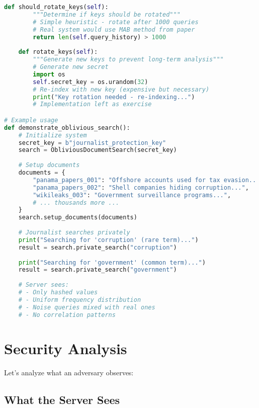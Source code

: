 \begin{lstlisting}[language=Python, caption=Complete oblivious document search]
    def should_rotate_keys(self):
        """Determine if keys should be rotated"""
        # Simple heuristic - rotate after 1000 queries
        # Real system would use MAB method from paper
        return len(self.query_history) > 1000
    
    def rotate_keys(self):
        """Generate new keys to prevent long-term analysis"""
        # Generate new secret
        import os
        self.secret_key = os.urandom(32)
        # Re-index with new key (expensive but necessary)
        print("Key rotation needed - re-indexing...")
        # Implementation left as exercise

# Example usage
def demonstrate_oblivious_search():
    # Initialize system
    secret_key = b"journalist_protection_key"
    search = ObliviousDocumentSearch(secret_key)
    
    # Setup documents
    documents = {
        "panama_papers_001": "Offshore accounts used for tax evasion...",
        "panama_papers_002": "Shell companies hiding corruption...",
        "wikileaks_003": "Government surveillance programs...",
        # ... thousands more ...
    }
    search.setup_documents(documents)
    
    # Journalist searches privately
    print("Searching for 'corruption' (rare term)...")
    result = search.private_search("corruption")
    
    print("Searching for 'government' (common term)...")
    result = search.private_search("government")
    
    # Server sees:
    # - Only hashed values
    # - Uniform frequency distribution
    # - Noise queries mixed with real ones
    # - No correlation patterns
\end{lstlisting}

\section{Security Analysis}

Let's analyze what an adversary observes:

\subsection{What the Server Sees}

